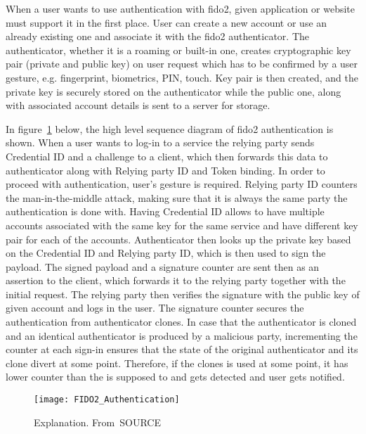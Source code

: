 When a user wants to use authentication with \acrshort{fido}2, given application or website must support it in the first place. User can create a new account or use an already existing one and associate it with the \acrshort{fido}2 authenticator. The authenticator, whether it is a roaming or built-in one, creates cryptographic key pair (private and public key) on user request which has to be confirmed by a user gesture, e.g. fingerprint, biometrics, PIN, touch. Key pair is then created, and the private key is securely stored on the authenticator while the public one, along with associated account details is sent to a server for storage.

In figure~\ref{fig:fido2_authentication} below, the high level sequence diagram of \acrshort{fido}2 authentication is shown. When a user wants to log-in to a service the relying party sends Credential ID and a challenge to a client, which then forwards this data to authenticator along with Relying party ID and Token binding. In order to proceed with authentication, user's gesture is required. Relying party ID counters the man-in-the-middle attack, making sure that it is always the same party the authentication is done with. Having Credential ID allows to have multiple accounts associated with the same key for the same service and have different key pair for each of the accounts. Authenticator then looks up the private key based on the Credential ID and Relying party ID, which is then used to sign the payload. The signed payload and a signature counter are sent then as an assertion to the client, which forwards it to the relying party together with the initial request. The relying party then verifies the signature with the public key of given account and logs in the user. The signature counter secures the authentication from authenticator clones. In case that the authenticator is cloned and an identical authenticator is produced by a malicious party, incrementing the counter at each sign-in ensures that the state of the original authenticator and its clone divert at some point. Therefore, if the clones is used at some point, it has lower counter than the is supposed to and gets detected and user gets notified.

\begin{figure}[ht]
    \centering
    \texttt{[image: FIDO2\_Authentication]}
    \caption{Explanation. From~\cite{}SOURCE}
    \label{fig:fido2_authentication}
\end{figure}